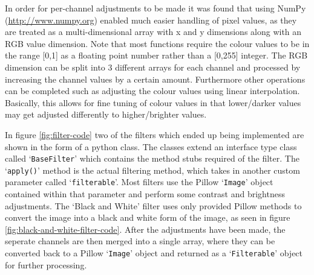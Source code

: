 \documentclass[a4paper,12pt]{report}
\begin{document}
      In order for per-channel adjustments to be made it was found that using NumPy (\url{http://www.numpy.org}) enabled much easier handling of pixel values, as they are treated as a multi-dimensional array with x and y dimensions along with an RGB value dimension. Note that most functions require the colour values to be in the range [0,1] as a floating point number rather than a [0,255] integer. The RGB dimension can be split into 3 different arrays for each channel and processed by increasing the channel values by a certain amount. Furthermore other operations can be completed such as adjusting the colour values using linear interpolation. Basically, this allows for fine tuning of colour values in that lower/darker values may get adjusted differently to higher/brighter values.

      In figure \ref{fig:filter-code} two of the filters which ended up being implemented are shown in the form of a python class. The classes extend an interface type class called ‘\texttt{BaseFilter}’ which contains the method stubs required of the filter. The ‘\texttt{apply()}’ method is the actual filtering method, which takes in another custom parameter called ‘\texttt{filterable}’. Most filters use the Pillow ‘\texttt{Image}’ object contained within that parameter and perform some contrast and brightness adjustments. The ‘Black and White’ filter uses only provided Pillow methods to convert the image into a black and white form of the image, as seen in figure \ref{fig:black-and-white-filter-code}. After the adjustments have been made, the seperate channels are then merged into a single array, where they can be converted back to a Pillow ‘\texttt{Image}’ object and returned as a ‘\texttt{Filterable}’ object for further processing.
\end{document}
